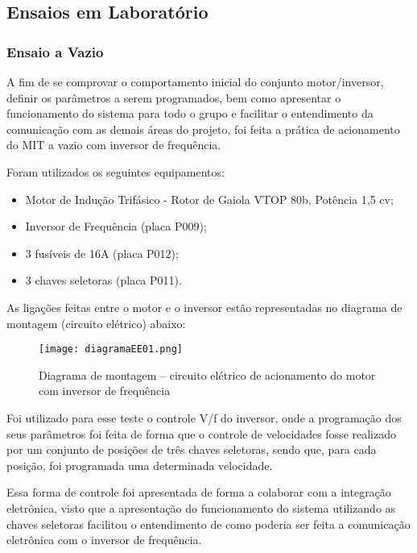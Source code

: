 \subsection{Ensaios em Laboratório}
		
	\subsubsection{Ensaio a Vazio}

		A fim de se comprovar o comportamento inicial do conjunto motor/inversor, definir os parâmetros a serem programados, bem como apresentar o funcionamento do sistema para todo o grupo e facilitar o entendimento da comunicação com as demais áreas do projeto, foi feita a prática de acionamento do MIT a vazio com inversor de frequência.

		Foram utilizados os seguintes equipamentos:

		\begin{itemize}
			\item Motor de Indução Trifásico - Rotor de Gaiola VTOP 80b, Potência 1,5 cv;
			\item Inversor de Frequência (placa P009);
			\item 3 fusíveis de 16A (placa P012);
			\item 3 chaves seletoras (placa P011). 
		\end{itemize}

		As ligações feitas entre o motor e o inversor estão representadas no diagrama de montagem (circuito elétrico) abaixo:

		\newpage
		\begin{figure}[!h]
			\centering
			\texttt{[image: diagramaEE01.png]}
			\caption{Diagrama de montagem – circuito elétrico de acionamento do motor com inversor de frequência} 
			\label{diagramaEE01}
		\end{figure}

		Foi utilizado para esse teste o controle V/f do inversor, onde a programação dos seus parâmetros foi feita de forma que o controle de velocidades fosse realizado por um conjunto de posições de três chaves seletoras, sendo que, para cada posição, foi programada uma determinada velocidade. 

		Essa forma de controle foi apresentada de forma a colaborar com a integração eletrônica, visto que a apresentação do funcionamento do sistema utilizando as chaves seletoras facilitou o entendimento de como poderia ser feita a comunicação eletrônica com o inversor de frequência.

